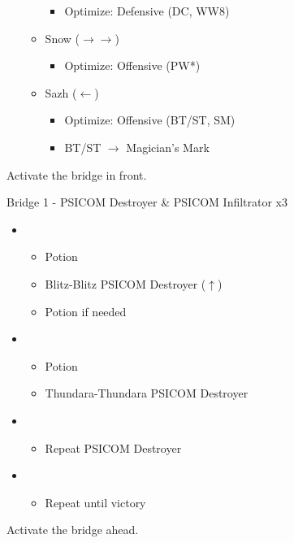 \begin{multicols}{2}
\begin{menu}
\begin{itemize}
\begin{itemize}
              \begin{itemize}
                \item Optimize: Defensive (DC, WW8)
              \end{itemize}
        \item Snow ($\rightarrow\rightarrow$)
              \begin{itemize}
                \item Optimize: Offensive (PW*)
              \end{itemize}
        \item Sazh ($\leftarrow$)
              \begin{itemize}
                \item Optimize: Offensive (BT/ST, SM)
                \item BT/ST $\rightarrow$ Magician's Mark
              \end{itemize}
      \end{itemize}
    \end{itemize}
  \end{menu}

  Activate the bridge in front.

  \begin{battle}{Bridge 1 - PSICOM Destroyer \& PSICOM Infiltrator x3}
    \begin{itemize}
      \item \first
            \begin{itemize}
              \item Potion
              \item Blitz-Blitz PSICOM Destroyer ($\uparrow$)
              \item Potion if needed
            \end{itemize}
      \item \fourth
            \begin{itemize}
              \item Potion
              \item Thundara-Thundara PSICOM Destroyer
            \end{itemize}
      \item \first
            \begin{itemize}
              \item Repeat PSICOM Destroyer
            \end{itemize}
      \item \sixth
            \begin{itemize}
              \item Repeat until victory
            \end{itemize}
    \end{itemize}
      
  \end{battle}
  Activate the bridge ahead.
  \vfill


\end{multicols}
